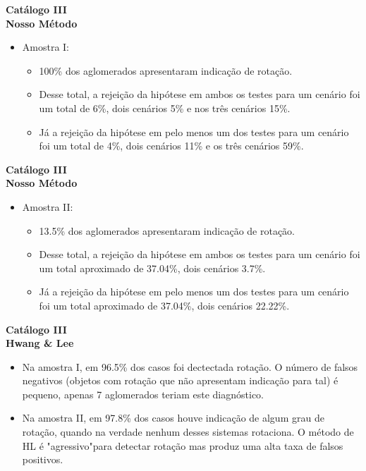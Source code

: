 \documentclass[xcolor=dvipsnames,10pt]{beamer}
\begin{document}
\begin{frame}{\textbf{Catálogo III}}
  \\
  {\textbf{Nosso Método}}
  \begin{itemize}
    \item Amostra I:
    \begin{itemize}
      \item 100\% dos aglomerados apresentaram indicação de rotação.
      \item Desse total, a rejeição da hipótese em ambos os testes para um cenário foi um total de 6\%, dois cenários 5\% e nos três cenários 15\%.
      \item Já a rejeição da hipótese em pelo menos um dos testes para um cenário foi um total de 4\%, dois cenários 11\% e os três cenários 59\%.
    \end{itemize}
  \end{itemize}
\end{frame}

\begin{frame}{\textbf{Catálogo III}}
  \\
  {\textbf{Nosso Método}}
  \begin{itemize}
    \item Amostra II:
    \begin{itemize}
      \item 13.5\% dos aglomerados apresentaram indicação de rotação.
      \item Desse total, a rejeição da hipótese em ambos os testes para um cenário foi um total aproximado de 37.04\%, dois cenários 3.7\%.
      \item Já a rejeição da hipótese em pelo menos um dos testes para um cenário foi um total aproximado de 37.04\%, dois cenários 22.22\%.
    \end{itemize}
  \end{itemize}
\end{frame}

\begin{frame}{\textbf{Catálogo III}}
  \\
  {\textbf{Hwang \& Lee}}
  \begin{itemize}
    \item Na amostra I, em 96.5\% dos casos foi dectectada rotação. O número de falsos negativos (objetos com rotação
que não apresentam indicação para tal) é pequeno, apenas 7 aglomerados teriam este diagnóstico.
    \item Na amostra II, em 97.8\% dos casos houve indicação de algum grau de rotação, quando na verdade nenhum desses sistemas rotaciona. O método de HL é "agressivo"para detectar rotação mas produz uma alta taxa de falsos positivos.
  \end{itemize}
\end{frame}
\end{document}
